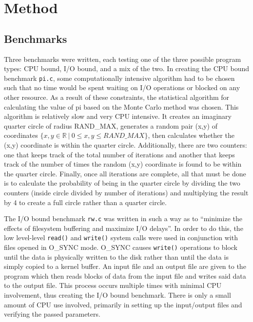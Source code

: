 ﻿\section{Method}

\subsection{Benchmarks}

Three benchmarks were written, each testing one of the three possible program types: CPU bound, I/O bound, and a mix of the two.  In creating the CPU bound benchmark \texttt{pi.c}, some computationally intensive algorithm had to be chosen such that no time would be spent waiting on I/O operations or blocked on any other resource.  As a result of these constraints, the statistical algorithm for calculating the value of pi based on the Monte Carlo method was chosen\cite{Sayler-pi}.  This algorithm is relatively slow and very CPU intensive.  It creates an imaginary quarter circle of radius RAND\_MAX, generates a random pair (x,y) of coordinates $\{x,y \in \mathbb{R}\ |\ 0 \le x,y \le RAND\_MAX\}$, then calculates whether the (x,y) coordinate is within the quarter circle.  Additionally, there are two counters: one that keeps track of the total number of iterations and another that keeps track of the number of times the random (x,y) coordinate is found to be within the quarter circle.  Finally, once all iterations are complete, all that must be done is to calculate the probability of being in the quarter circle by dividing the two counters (inside circle divided by number of iterations) and multiplying the result by 4 to create a full circle rather than a quarter circle.

The I/O bound benchmark \texttt{rw.c} was written in such a way as to ``minimize the effects of filesystem buffering and maximize I/O delays''\cite{Sayler-PDF}.  In order to do this, the low level-level \texttt{read()} and \texttt{write()} system calls were used in conjunction with files opened in O\_SYNC mode.  O\_SYNC causes \texttt{write()} operations to block until the data is physically written to the disk rather than until the data is simply copied to a kernel buffer\cite{man-open}.  An input file and an output file are given to the program which then reads blocks of data from the input file and writes said data to the output file.  This process occurs multiple times with minimal CPU involvement, thus creating the I/O bound benchmark.  There is only a small amount of CPU use involved, primarily in setting up the input/output files and verifying the passed parameters.

